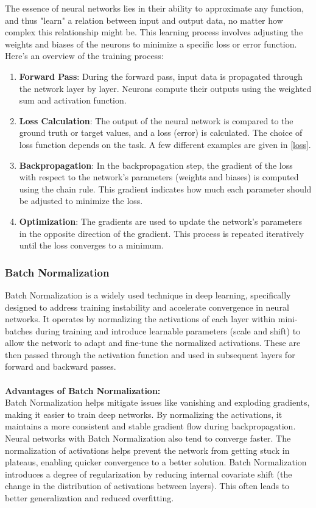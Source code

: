 The essence of neural networks lies in their ability to approximate any function, and thus "learn" a relation between input and output data, no matter how complex this relationship might be. This learning process involves adjusting the weights and biases of the neurons to minimize a specific loss or error function. Here's an overview of the training process:

\begin{enumerate}
	\item \textbf{Forward Pass}: During the forward pass, input data is propagated through the network layer by layer. Neurons compute their outputs using the weighted sum and activation function.
	
	\item \textbf{Loss Calculation}: The output of the neural network is compared to the ground truth or target values, and a loss (error) is calculated. The choice of loss function depends on the task. A few different examples are given in \ref{loss}.
	
	\item \textbf{Backpropagation}: In the backpropagation step, the gradient of the loss with respect to the network's parameters (weights and biases) is computed using the chain rule. This gradient indicates how much each parameter should be adjusted to minimize the loss.
	
	\item \textbf{Optimization}: The gradients are used to update the network's parameters in the opposite direction of the gradient. This process is repeated iteratively until the loss converges to a minimum.
\end{enumerate}

\subsubsection{Batch Normalization}

Batch Normalization is a widely used technique in deep learning, specifically designed to address training instability and accelerate convergence in neural networks. It operates by normalizing the activations of each layer within mini-batches during training and introduce learnable parameters (scale and shift) to allow the network to adapt and fine-tune the normalized activations.
These are then passed through the activation function and used in subsequent layers for forward and backward passes.
\\ \\
\textbf{Advantages of Batch Normalization:} \\
Batch Normalization helps mitigate issues like vanishing and exploding gradients, making it easier to train deep networks. By normalizing the activations, it maintains a more consistent and stable gradient flow during backpropagation.
Neural networks with Batch Normalization also tend to converge faster. The normalization of activations helps prevent the network from getting stuck in plateaus, enabling quicker convergence to a better solution.
Batch Normalization introduces a degree of regularization by reducing internal covariate shift (the change in the distribution of activations between layers). This often leads to better generalization and reduced overfitting.


